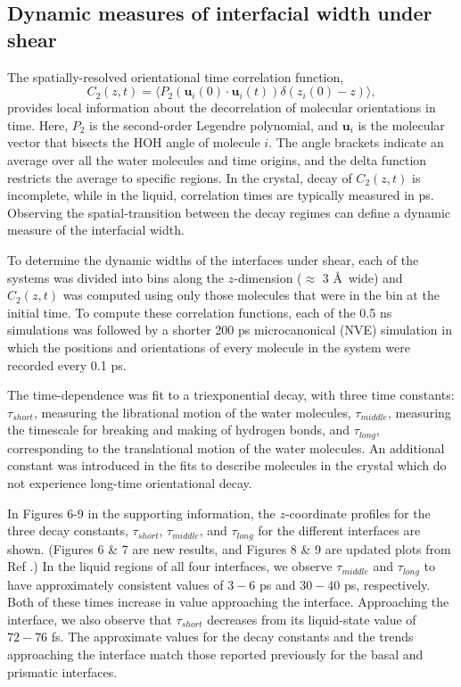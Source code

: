 \subsection{Dynamic measures of interfacial width under shear}
The spatially-resolved orientational time correlation function,
\begin{equation}\label{C(t)1}
  C_{2}(z,t)=\langle P_{2}(\mathbf{u}_i(0)\cdot \mathbf{u}_i(t))
  \delta(z_i(0) - z) \rangle,
\end{equation}
provides local information about the decorrelation of molecular
orientations in time. Here, $P_{2}$ is the second-order Legendre
polynomial, and $\mathbf{u}_i$ is the molecular vector that bisects
the HOH angle of molecule $i$.  The angle brackets indicate an average
over all the water molecules and time origins, and the delta function
restricts the average to specific regions. In the crystal, decay of
$C_2(z,t)$ is incomplete, while in the liquid, correlation times are
typically measured in ps.  Observing the spatial-transition between
the decay regimes can define a dynamic measure of the interfacial
width.

To determine the dynamic widths of the interfaces under shear, each of
the systems was divided into bins along the $z$-dimension ($\approx$ 3
\AA\ wide) and $C_2(z,t)$ was computed using only those molecules that
were in the bin at the initial time.  To compute these correlation
functions, each of the 0.5 ns simulations was followed by a shorter
200 ps microcanonical (NVE) simulation in which the positions and
orientations of every molecule in the system were recorded every 0.1
ps. 

The time-dependence was fit to a triexponential decay, with three time
constants: $\tau_{short}$, measuring the librational motion of the
water molecules, $\tau_{middle}$, measuring the timescale for breaking
and making of hydrogen bonds, and $\tau_{long}$, corresponding to the
translational motion of the water molecules.  An additional constant
was introduced in the fits to describe molecules in the crystal which
do not experience long-time orientational decay.

In Figures 6-9 in the supporting information, the $z$-coordinate
profiles for the three decay constants, $\tau_{short}$,
$\tau_{middle}$, and $\tau_{long}$ for the different interfaces are
shown.  (Figures 6 \& 7 are new results, and Figures 8 \& 9 are
updated plots from Ref \citealp{Louden13}.)  In the liquid regions of
all four interfaces, we observe $\tau_{middle}$ and $\tau_{long}$ to
have approximately consistent values of $3-6$ ps and $30-40$ ps,
respectively.  Both of these times increase in value approaching the
interface.  Approaching the interface, we also observe that
$\tau_{short}$ decreases from its liquid-state value of $72-76$ fs.
The approximate values for the decay constants and the trends
approaching the interface match those reported previously for the
basal and prismatic interfaces.

